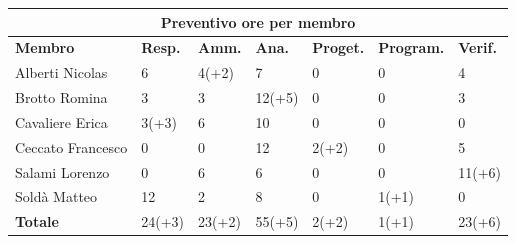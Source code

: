 \documentclass[a4paper, 12pt]{article}
\begin{document}
\begin{center}
	\begin{tabularx}{\textwidth}{|X|X|X|X|X|X|X|}
		\hline
		\multicolumn{7}{|c|}{\textbf{Preventivo ore per membro}}                                         \\
		\hline
		\hline
		\textbf{Membro}   & \textbf{Resp.}    & \textbf{Amm.}   & \textbf{Ana.} &
		\textbf{Proget.}  & \textbf{Program.} & \textbf{Verif.}                                          \\
		\hline
		Alberti Nicolas   & 6                 & 4(+2)           & 7             & 0     & 0     & 4      \\
		\hline
		Brotto Romina     & 3                 & 3               & 12(+5)        & 0     & 0     & 3      \\
		\hline
		Cavaliere Erica   & 3(+3)             & 6               & 10            & 0     & 0     & 0      \\
		\hline
		Ceccato Francesco & 0                 & 0               & 12            & 2(+2) & 0     & 5      \\
		\hline
		Salami Lorenzo    & 0                 & 6               & 6             & 0     & 0     & 11(+6) \\
		\hline
		Soldà Matteo      & 12                & 2               & 8             & 0     & 1(+1) & 0      \\
		\hline
		\hline
		\textbf{Totale}   & 24(+3)            & 23(+2)          & 55(+5)        & 2(+2) & 1(+1) & 23(+6) \\
		\hline
	\end{tabularx}\\[8pt]
	\mbox{}\\
\end{center}

\newpage
\end{document}
